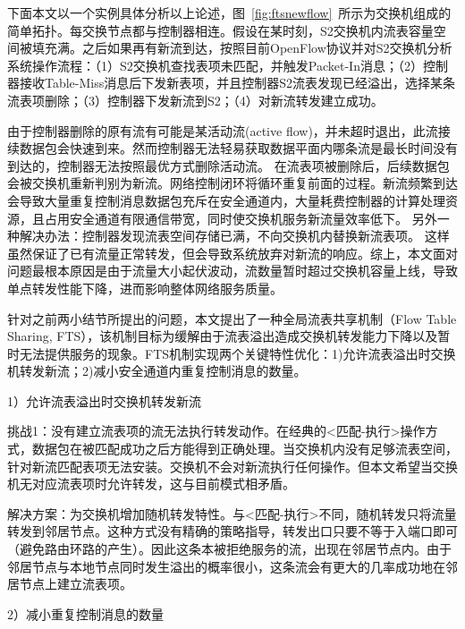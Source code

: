 下面本文以一个实例具体分析以上论述，图~\ref{fig:ftsnewflow}~所示为交换机组成的简单拓扑。每交换节点都与控制器相连。假设在某时刻，S2交换机内流表容量空间被填充满。之后如果再有新流到达，按照目前OpenFlow协议并对S2交换机分析系统操作流程：（1）S2交换机查找表项未匹配，并触发Packet-In消息；（2）控制器接收Table-Miss消息后下发新表项，并且控制器S2流表发现已经溢出，选择某条流表项删除；（3）控制器下发新流到S2；（4）对新流转发建立成功。



由于控制器删除的原有流有可能是某活动流(active flow)，并未超时退出，此流接续数据包会快速到来。然而控制器无法轻易获取数据平面内哪条流是最长时间没有到达的，控制器无法按照最优方式删除活动流。
在流表项被删除后，后续数据包会被交换机重新判别为新流。网络控制闭环将循环重复前面的过程。新流频繁到达会导致大量重复控制消息数据包充斥在安全通道内，大量耗费控制器的计算处理资源，且占用安全通道有限通信带宽，同时使交换机服务新流量效率低下。
另外一种解决办法：控制器发现流表空间存储已满，不向交换机内替换新流表项。
这样虽然保证了已有流量正常转发，但会导致系统放弃对新流的响应。综上，本文面对问题最根本原因是由于流量大小起伏波动，流数量暂时超过交换机容量上线，导致单点转发性能下降，进而影响整体网络服务质量。




\label{chap54}

针对之前两小结节所提出的问题，本文提出了一种全局流表共享机制（Flow Table Sharing, FTS），该机制目标为缓解由于流表溢出造成交换机转发能力下降以及暂时无法提供服务的现象。FTS机制实现两个关键特性优化：1)允许流表溢出时交换机转发新流；2)减小安全通道内重复控制消息的数量。

1）允许流表溢出时交换机转发新流

挑战1：没有建立流表项的流无法执行转发动作。在经典的<匹配-执行>操作方式，数据包在被匹配成功之后方能得到正确处理。当交换机内没有足够流表空间，针对新流匹配表项无法安装。交换机不会对新流执行任何操作。但本文希望当交换机无对应流表项时允许转发，这与目前模式相矛盾。

解决方案：为交换机增加随机转发特性。与<匹配-执行>不同，随机转发只将流量转发到邻居节点。这种方式没有精确的策略指导，转发出口只要不等于入端口即可（避免路由环路的产生）。因此这条本被拒绝服务的流，出现在邻居节点内。由于邻居节点与本地节点同时发生溢出的概率很小，这条流会有更大的几率成功地在邻居节点上建立流表项。


2）减小重复控制消息的数量

